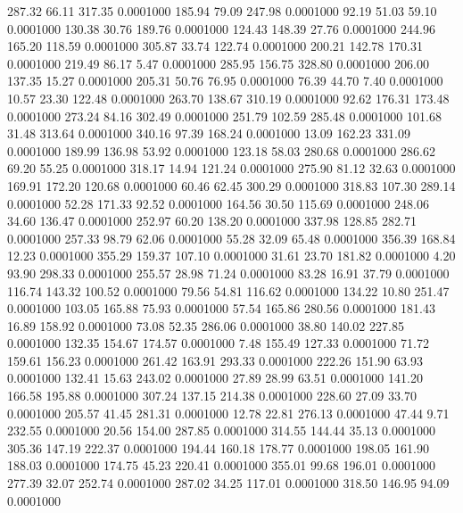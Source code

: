  287.32   66.11  317.35   0.0001000
 185.94   79.09  247.98   0.0001000
  92.19   51.03   59.10   0.0001000
 130.38   30.76  189.76   0.0001000
 124.43  148.39   27.76   0.0001000
 244.96  165.20  118.59   0.0001000
 305.87   33.74  122.74   0.0001000
 200.21  142.78  170.31   0.0001000
 219.49   86.17    5.47   0.0001000
 285.95  156.75  328.80   0.0001000
 206.00  137.35   15.27   0.0001000
 205.31   50.76   76.95   0.0001000
  76.39   44.70    7.40   0.0001000
  10.57   23.30  122.48   0.0001000
 263.70  138.67  310.19   0.0001000
  92.62  176.31  173.48   0.0001000
 273.24   84.16  302.49   0.0001000
 251.79  102.59  285.48   0.0001000
 101.68   31.48  313.64   0.0001000
 340.16   97.39  168.24   0.0001000
  13.09  162.23  331.09   0.0001000
 189.99  136.98   53.92   0.0001000
 123.18   58.03  280.68   0.0001000
 286.62   69.20   55.25   0.0001000
 318.17   14.94  121.24   0.0001000
 275.90   81.12   32.63   0.0001000
 169.91  172.20  120.68   0.0001000
  60.46   62.45  300.29   0.0001000
 318.83  107.30  289.14   0.0001000
  52.28  171.33   92.52   0.0001000
 164.56   30.50  115.69   0.0001000
 248.06   34.60  136.47   0.0001000
 252.97   60.20  138.20   0.0001000
 337.98  128.85  282.71   0.0001000
 257.33   98.79   62.06   0.0001000
  55.28   32.09   65.48   0.0001000
 356.39  168.84   12.23   0.0001000
 355.29  159.37  107.10   0.0001000
  31.61   23.70  181.82   0.0001000
   4.20   93.90  298.33   0.0001000
 255.57   28.98   71.24   0.0001000
  83.28   16.91   37.79   0.0001000
 116.74  143.32  100.52   0.0001000
  79.56   54.81  116.62   0.0001000
 134.22   10.80  251.47   0.0001000
 103.05  165.88   75.93   0.0001000
  57.54  165.86  280.56   0.0001000
 181.43   16.89  158.92   0.0001000
  73.08   52.35  286.06   0.0001000
  38.80  140.02  227.85   0.0001000
 132.35  154.67  174.57   0.0001000
   7.48  155.49  127.33   0.0001000
  71.72  159.61  156.23   0.0001000
 261.42  163.91  293.33   0.0001000
 222.26  151.90   63.93   0.0001000
 132.41   15.63  243.02   0.0001000
  27.89   28.99   63.51   0.0001000
 141.20  166.58  195.88   0.0001000
 307.24  137.15  214.38   0.0001000
 228.60   27.09   33.70   0.0001000
 205.57   41.45  281.31   0.0001000
  12.78   22.81  276.13   0.0001000
  47.44    9.71  232.55   0.0001000
  20.56  154.00  287.85   0.0001000
 314.55  144.44   35.13   0.0001000
 305.36  147.19  222.37   0.0001000
 194.44  160.18  178.77   0.0001000
 198.05  161.90  188.03   0.0001000
 174.75   45.23  220.41   0.0001000
 355.01   99.68  196.01   0.0001000
 277.39   32.07  252.74   0.0001000
 287.02   34.25  117.01   0.0001000
 318.50  146.95   94.09   0.0001000
